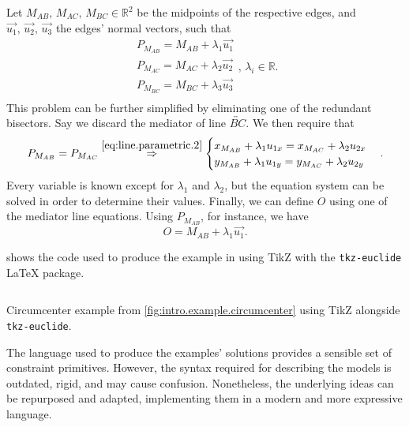 Let $M_{AB},\, M_{AC},\, M_{BC} \in \mathbb{R}^2$ be the midpoints of the
respective edges, and $\vec{u_1},\,\vec{u_2},\,\vec{u_3}$ the edges' normal
vectors, such that
\[
  \begin{split}
    P_{M_{AB}} = M_{AB} + \lambda_1 \vec{u_1} \\
    P_{M_{AC}} = M_{AC} + \lambda_2 \vec{u_2} \\
    P_{M_{BC}} = M_{BC} + \lambda_3 \vec{u_3} \\
  \end{split},\,\lambda_i \in \mathbb{R}.
\]
This problem can be further simplified by eliminating one of the redundant
bisectors.  Say we discard the mediator of line $\overleftrightarrow{BC}$.  We
then require that
\[
  P_{M_{AB}} = P_{M_{AC}} \stackrel{\eqref{eq:line.parametric.2}}{\Rightarrow}
  \begin{cases}
    x_{M_{AB}} + \lambda_1 u_{1x} = x_{M_{AC}} + \lambda_2 u_{2x} \\
    y_{M_{AB}} + \lambda_1 u_{1y} = y_{M_{AC}} + \lambda_2 u_{2y} \\
  \end{cases}.
\]
Every variable is known except for $\lambda_1$ and $\lambda_2$, but the equation
system can be solved in order to determine their values.  Finally, we can define
$O$ using one of the mediator line equations.  Using $P_{M_{AB}}$, for instance,
we have
\[
  O = M_{AB} + \lambda_1 \vec{u_1}.
\]

 shows the code used to produce the
example in  using \acs{TikZ} with the
\texttt{tkz-euclide} \LaTeX{} package.

\begin{listing}[htb]
  \inputminted[highlightlines=3]{latex}{tikz/ex-circumcenter.tikz}
  \caption[Circumcenter example using TikZ]{
    Circumcenter example from \cref{fig:intro.example.circumcenter} using
    \acs{TikZ} alongside \texttt{tkz-euclide}.}%
  \label{lst:intro.example.circumcenter.tikz}
\end{listing}

The language used to produce the examples' solutions provides a sensible set of
constraint primitives.  However, the syntax required for describing the models
is outdated, rigid, and may cause confusion.  Nonetheless, the underlying ideas
can be repurposed and adapted, implementing them in a modern and more expressive
language.

